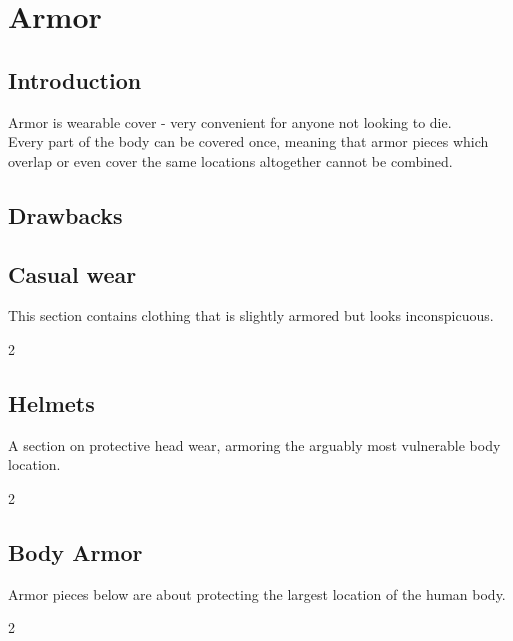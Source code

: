 \section{Armor}
\subsection{Introduction}
Armor is wearable cover - very convenient for anyone not looking to die.\\
Every part of the body can be covered once, meaning that armor pieces which overlap or even cover the same locations altogether cannot be combined.

\subsection{Drawbacks}


\subsection{Casual wear}
This section contains clothing that is slightly armored but looks inconspicuous.\par
\begin{multicols}{2}
\end{multicols}

\subsection{Helmets}
A section on protective head wear, armoring the arguably most vulnerable body location.\par
\begin{multicols}{2}
\end{multicols}

\subsection{Body Armor}
Armor pieces below are about protecting the largest location of the human body.\par
\begin{multicols}{2}
\end{multicols}

\newpage%
